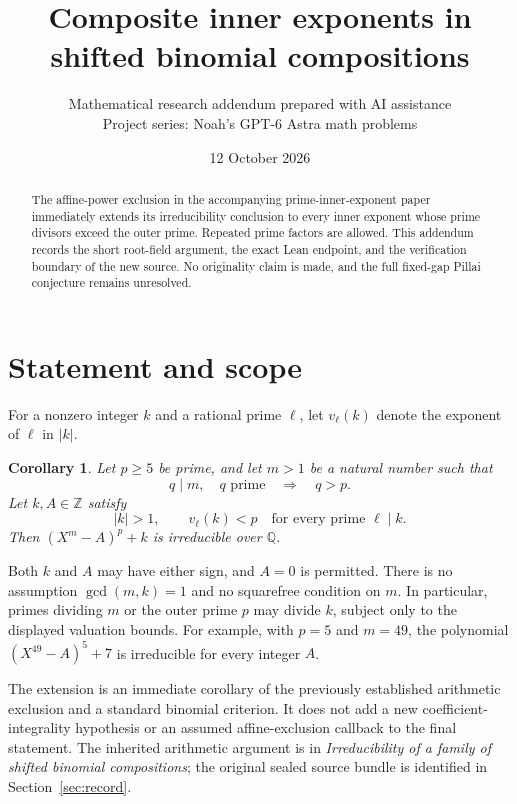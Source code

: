 \documentclass[11pt,letterpaper]{article}
\title{Composite inner exponents in shifted binomial compositions}
\author{Mathematical research addendum prepared with AI assistance\\[0.3em]\small Project series: Noah's GPT-6 Astra math problems}
\date{12 October 2026}
\newtheorem{corollary}{Corollary}
\newcommand{\Q}{\mathbb Q}
\newcommand{\Z}{\mathbb Z}
\begin{document}
\maketitle
\begin{abstract}
The affine-power exclusion in the accompanying prime-inner-exponent paper
immediately extends its irreducibility conclusion to every inner exponent
whose prime divisors exceed the outer prime. Repeated prime factors are
allowed. This addendum records the short root-field argument, the exact Lean
endpoint, and the verification boundary of the new source. No originality
claim is made, and the full fixed-gap Pillai conjecture remains unresolved.
\end{abstract}

\section{Statement and scope}
For a nonzero integer $k$ and a rational prime $\ell$, let $v_\ell(k)$
denote the exponent of $\ell$ in $|k|$.

\begin{corollary}\label{cor:main}
Let $p\ge5$ be prime, and let $m>1$ be a natural number such that
\[
 q\mid m,\quad q\text{ prime}\quad\Longrightarrow\quad q>p.
\]
Let $k,A\in\Z$ satisfy
\[
 |k|>1,\qquad v_\ell(k)<p\quad\text{for every prime }\ell\mid k.
\]
Then $(X^m-A)^p+k$ is irreducible over $\Q$.
\end{corollary}

Both $k$ and $A$ may have either sign, and $A=0$ is permitted.
There is no assumption $\gcd(m,k)=1$ and no squarefree condition on $m$.
In particular, primes dividing $m$ or the outer prime $p$ may divide $k$,
subject only to the displayed valuation bounds. For example, with $p=5$
and $m=49$, the polynomial $(X^{49}-A)^5+7$ is irreducible for every
integer $A$.

The extension is an immediate corollary of the previously established
arithmetic exclusion and a standard binomial criterion. It does not add a
new coefficient-integrality hypothesis or an assumed affine-exclusion
callback to the final statement. The inherited arithmetic argument is in
\emph{Irreducibility of a family of shifted binomial compositions}; the
original sealed source bundle is identified in Section~\ref{sec:record}.
\end{document}
